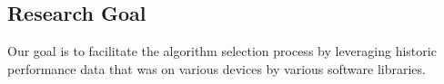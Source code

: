 \documentclass{article}
\begin{document}
\subsection{Research Goal}
Our goal is to facilitate the algorithm selection process by leveraging historic performance data that was on various devices by various software libraries.









\end{document}
